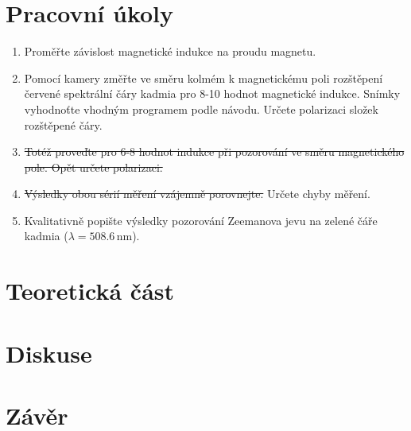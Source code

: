 \documentclass[10pt,a4paper]{article}
\renewcommand{\U}[1]{\ensuremath{\,\mathrm{#1}}}
\newcommand{\°}{\degree}
\begin{document}

\setmainfont{Linux Libertine O}




\section{Pracovní úkoly}
\begin{enumerate}

    \item Proměřte závislost magnetické indukce na proudu magnetu.
    \item Pomocí kamery změřte ve směru kolmém k magnetickému poli rozštěpení červené spektrální čáry kadmia pro 8-10 hodnot magnetické indukce. Snímky vyhodnoťte vhodným programem podle návodu. Určete polarizaci složek rozštěpené čáry.
    \item \st{Totéž proveďte pro 6-8 hodnot indukce při pozorování ve směru magnetického pole. Opět určete polarizaci.}
    \item \st{Výsledky obou sérií měření vzájemně porovnejte.} Určete chyby měření.
    \item Kvalitativně popište výsledky pozorování Zeemanova jevu na zelené čáře kadmia ($\lambda = 508.6 \U{nm}$).
\end{enumerate}

\section{Teoretická část}

\begin{figure}[p]
    \centering
    \caption{}
    \label{}
\end{figure}

\section{Diskuse}



\section{Závěr}
\end{document}
